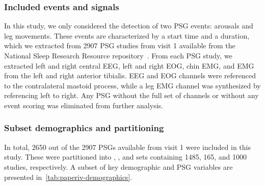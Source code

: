\subsubsection{Included events and signals}
In this study, we only considered the detection of two \ac{PSG} events: arousals and leg movements. 
These events are characterized by a start time and a duration, which we extracted from 2907 \ac{PSG} studies from visit 1 available from the National Sleep Research Resource repository~\cite{Dean2016,Zhang2018}. 
From each \ac{PSG} study, we extracted left and right central \ac{EEG}, left and right \ac{EOG}, chin \ac{EMG}, and \ac{EMG} from the left and right anterior tibialis. 
\Ac{EEG} and \ac{EOG} channels were referenced to the contralateral mastoid process, while a leg \ac{EMG} channel was synthesized by referencing left to right. 
Any \ac{PSG} without the full set of channels or without any event scoring was eliminated from further analysis.

\subsubsection{Subset demographics and partitioning}
In total, 2650 out of the 2907 \acp{PSG} available from visit 1 were included in this study. 
These were partitioned into \train, \eval, and \test sets containing 1485, 165, and 1000 studies, respectively. 
A subset of key demographic and \ac{PSG} variables are presented in~\cref{tab:paperiv-demographics}.

